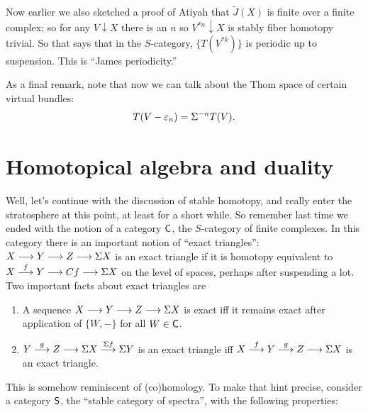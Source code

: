 Now earlier we also sketched a proof of Atiyah that $\widetilde J(X)$ is finite over a finite complex; so for any $V\downarrow X$ there is an $n$ so $V^{\ast n}\downarrow X$ is stably fiber homotopy trivial.  So that says that in the $S$-category, $\{T(V^{\ast k})\}$ is periodic up to suspension.  This is ``James periodicity.''

As a final remark, note that now we can talk about the Thom space of certain virtual bundles: \[T(V - \varepsilon_n) = \Sigma^{-n} T(V).\]

\fi
\BoxedNote{}







\section{Homotopical algebra and duality} %
\label{HomotopicalAlgebraAndDuality}
\ifx\OutputHomotopicalAlgebraAndDuality\undefined\else
Well, let's continue with the discussion of stable homotopy, and really enter the stratosphere at this point, at least for a short while.  So remember last time we ended with the notion of a category $\mathsf{C}$, the $S$-category of finite complexes.  In this category there is an important notion of ``exact triangles'': $X \longrightarrow Y \longrightarrow Z \longrightarrow \Sigma X$ is an exact triangle if it is homotopy equivalent to $X \stackrel{f}{\longrightarrow} Y \longrightarrow Cf \longrightarrow \Sigma X$ on the level of spaces, perhaps after suspending a lot.  Two important facts about exact triangles are
\begin{enumerate}
\item A sequence $X \longrightarrow Y \longrightarrow Z \longrightarrow \Sigma X$ is exact iff it remains exact after application of $\{W, -\}$ for all $W \in \mathsf{C}$.
\item $Y \stackrel{g}{\longrightarrow} Z \longrightarrow \Sigma X \stackrel{\Sigma f}{\longrightarrow} \Sigma Y$ is an exact triangle iff $X \stackrel{f}{\longrightarrow} Y \stackrel{g}{\longrightarrow} Z \longrightarrow \Sigma X$ is an exact triangle.
\end{enumerate}
This is somehow reminiscent of (co)homology. To make that hint precise, consider a category $\mathsf{S}$, the ``stable category of spectra'', with the following properties:
